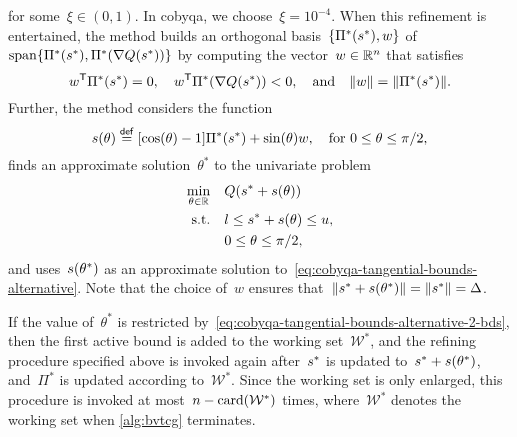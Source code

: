 for some~$\xi \in (0, 1)$.
In \gls{cobyqa}, we choose~$\xi = 10^{-4}$.
When this refinement is entertained, the method builds an orthogonal basis~$\set{\Pi^{\ast}(\sstep[\ast]), w}$ of~$\vspan \set{\Pi^{\ast}(\sstep[\ast]), \Pi^{\ast}(\nabla Q(\sstep[\ast]))}$ by computing the vector~$w \in \mathbb{R}^n$ that satisfies
\begin{equation*}
    w^{\T} \Pi^{\ast}(\sstep[\ast]) = 0, \quad w^{\T} \Pi^{\ast}(\nabla Q(\sstep[\ast])) < 0, \quad \text{and} \quad \norm{w} = \norm{\Pi^{\ast}(\sstep[\ast])}.
\end{equation*}
Further, the method considers the function
\begin{equation*}
    \sstep(\theta) \eqdef [\cos(\theta) - 1] \Pi^{\ast}(\sstep[\ast]) + \sin(\theta) w, \quad \text{for~$0 \le \theta \le \pi / 2$,}
\end{equation*}
finds an approximate solution~$\theta^{\ast}$ to the univariate problem
\begin{subequations}
    \begin{align}
        \min_{\theta \in \R}    & \quad Q(\sstep[\ast] + \sstep(\theta))\\
        \text{s.t.}             & \quad \xl \le \sstep[\ast] + \sstep(\theta) \le \xu, \label{eq:cobyqa-tangential-bounds-alternative-2-bds}\\
                                & \quad 0 \le \theta \le \pi / 2,
    \end{align}
\end{subequations}
and uses~$\sstep(\theta^{\ast})$ as an approximate solution to~\cref{eq:cobyqa-tangential-bounds-alternative}.
Note that the choice of~$w$ ensures that~$\norm{\sstep[\ast] + \sstep(\theta^{\ast})} = \norm{\sstep[\ast]} = \rad$.

If the value of~$\theta^{\ast}$ is restricted by~\cref{eq:cobyqa-tangential-bounds-alternative-2-bds}, then the first active bound is added to the working set~$\mathcal{W}^{\ast}$, and the refining procedure specified above is invoked again after~$\sstep[\ast]$ is updated to~$\sstep[\ast] + \sstep(\theta^{\ast})$, and~$\Pi^{\ast}$ is updated according to~$\mathcal{W}^{\ast}$.
Since the working set is only enlarged, this procedure is invoked at most~$n - \operatorname{card}(\mathcal{W}^{\ast})$ times, where~$\mathcal{W}^{\ast}$ denotes the working set when \cref{alg:bvtcg} terminates.

